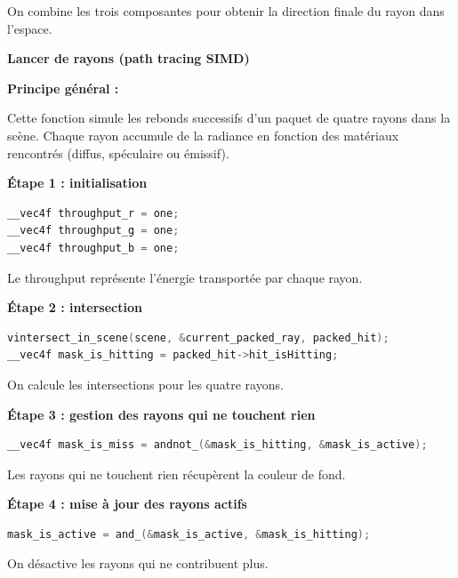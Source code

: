 On combine les trois composantes pour obtenir la direction finale du rayon dans l'espace.

\medskip


\textbf{Lancer de rayons (path tracing SIMD)}

\medskip

\textbf{Principe général :}

Cette fonction simule les rebonds successifs d'un paquet de quatre rayons dans la scène.  
Chaque rayon accumule de la radiance en fonction des matériaux rencontrés (diffus, spéculaire ou émissif).

\medskip

\textbf{Étape 1 : initialisation}

\begin{lstlisting}[language=C]
__vec4f throughput_r = one;
__vec4f throughput_g = one;
__vec4f throughput_b = one;
\end{lstlisting}

Le throughput représente l'énergie transportée par chaque rayon.

\medskip

\textbf{Étape 2 : intersection}

\begin{lstlisting}[language=C]
vintersect_in_scene(scene, &current_packed_ray, packed_hit);
__vec4f mask_is_hitting = packed_hit->hit_isHitting;
\end{lstlisting}

On calcule les intersections pour les quatre rayons.

\medskip

\textbf{Étape 3 : gestion des rayons qui ne touchent rien}

\begin{lstlisting}[language=C]
__vec4f mask_is_miss = andnot_(&mask_is_hitting, &mask_is_active);
\end{lstlisting}

Les rayons qui ne touchent rien récupèrent la couleur de fond.

\medskip

\textbf{Étape 4 : mise à jour des rayons actifs}

\begin{lstlisting}[language=C]
mask_is_active = and_(&mask_is_active, &mask_is_hitting);
\end{lstlisting}

On désactive les rayons qui ne contribuent plus.

\medskip

